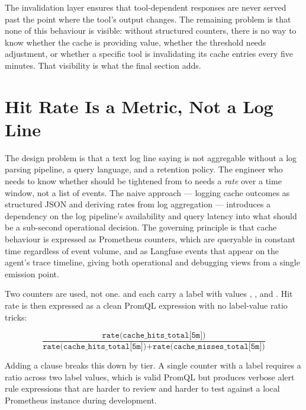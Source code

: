 The invalidation layer ensures that tool-dependent responses are never
served past the point where the tool's output changes. The remaining
problem is that none of this behaviour is visible: without structured
counters, there is no way to know whether the cache is providing value,
whether the threshold needs adjustment, or whether a specific tool is
invalidating its cache entries every five minutes. That visibility is
what the final section adds.


\section{Hit Rate Is a Metric, Not a Log Line}
\label{sec:cache-metrics}

The design problem is that a text log line saying
 is not aggregable without a log
parsing pipeline, a query language, and a retention policy. The engineer
who needs to know whether  should be tightened
from  to  needs a \emph{rate} over a time window,
not a list of events. The naive approach --- logging cache outcomes as
structured JSON and deriving rates from log aggregation --- introduces a
dependency on the log pipeline's availability and query latency into what
should be a sub-second operational decision. The governing principle is
that cache behaviour is expressed as Prometheus counters, which are
queryable in constant time regardless of event volume, and as Langfuse
events that appear on the agent's trace timeline, giving both operational
and debugging views from a single emission point.

Two counters are used, not one.  and
 each carry a  label with
values , , and . Hit rate is
then expressed as a clean PromQL expression with no label-value ratio
tricks:

\[
  \frac{\texttt{rate(cache\_hits\_total[5m])}}
       {\texttt{rate(cache\_hits\_total[5m])} + \texttt{rate(cache\_misses\_total[5m])}}
\]

Adding a  clause breaks this down by tier. A
single counter with a  label requires a ratio
across two label values, which is valid PromQL but produces verbose alert
rule expressions that are harder to review and harder to test against a
local Prometheus instance during development.

